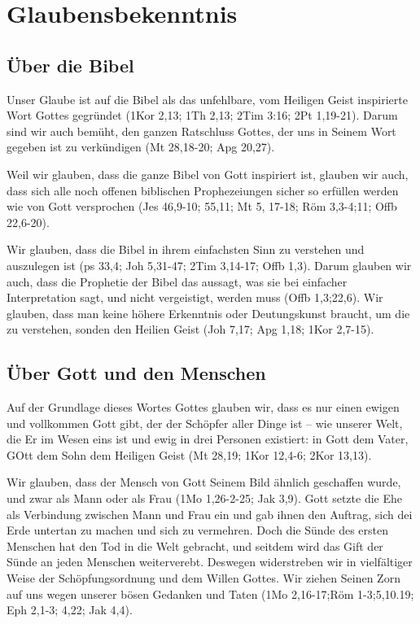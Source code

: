 \documentclass[12pt]{mybib}
\author{Lothar Schmid}
\begin{document}
\section{Glaubensbekenntnis}
\subsection{Über die Bibel}
Unser Glaube ist auf die Bibel als das unfehlbare, vom Heiligen Geist inspirierte Wort Gottes gegründet (1Kor 2,13; 1Th 2,13; 2Tim 3:16; 2Pt 1,19-21). Darum sind wir auch bemüht, den \glqq ganzen Ratschluss Gottes\grqq, der uns in Seinem Wort gegeben ist zu verkündigen (Mt 28,18-20; Apg 20,27).

Weil wir glauben, dass die ganze Bibel von Gott inspiriert ist, glauben wir auch, dass sich alle noch offenen biblischen Prophezeiungen sicher so erfüllen werden wie von Gott versprochen (Jes 46,9-10; 55,11; Mt 5, 17-18; Röm 3,3-4;11; Offb 22,6-20).

Wir glauben, dass die Bibel in ihrem einfachsten Sinn zu verstehen und auszulegen ist (ps 33,4; Joh 5,31-47; 2Tim 3,14-17; Offb 1,3). Darum glauben wir auch, dass die Prophetie der Bibel das aussagt, was sie bei einfacher Interpretation sagt, und nicht vergeistigt, werden muss (Offb 1,3;22,6). Wir glauben, dass man keine höhere Erkenntnis oder Deutungskunst braucht, um die zu verstehen, sonden den Heilien Geist (Joh 7,17; Apg 1,18; 1Kor 2,7-15).

\subsection{Über Gott und den Menschen}
Auf der Grundlage dieses Wortes Gottes glauben wir, dass es nur einen ewigen und vollkommen Gott gibt, der der Schöpfer aller Dinge ist -- wie unserer Welt, die Er im Wesen eins ist und ewig in drei Personen existiert: in Gott dem Vater, GOtt dem Sohn dem Heiligen Geist (Mt 28,19; 1Kor 12,4-6; 2Kor 13,13).

Wir glauben, dass der Mensch von Gott Seinem Bild ähnlich geschaffen wurde, und zwar als Mann oder als Frau (1Mo 1,26-2-25; Jak 3,9). Gott setzte die Ehe als Verbindung zwischen Mann und Frau ein und gab ihnen den Auftrag, sich dei Erde untertan zu machen und sich zu vermehren. Doch die Sünde des ersten Menschen hat den Tod in die Welt gebracht, und seitdem wird das Gift der Sünde an jeden Menschen weiterverebt. Deswegen widerstreben wir in vielfältiger Weise der Schöpfungsordnung und dem Willen Gottes. Wir ziehen Seinen Zorn auf uns wegen unserer bösen Gedanken und Taten (1Mo 2,16-17;Röm 1-3;5,10.19; Eph 2,1-3; 4,22; Jak 4,4).
\end{document}
